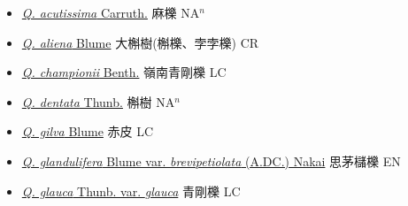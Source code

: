 \begin{itemize}
  \begin{itemize}
        \item[] \href{http://www.theplantlist.org/tpl1.1/search?q=Quercus+acutissima}{\textit{Q. acutissima} Carruth.}   麻櫟 NA$^n$
        \item[] \href{http://www.theplantlist.org/tpl1.1/search?q=Quercus+aliena}{\textit{Q. aliena} Blume}     大槲樹(槲櫟、孛孛櫟)    CR
        \item[] \href{http://www.theplantlist.org/tpl1.1/search?q=Quercus+championii}{\textit{Q. championii} Benth.}     嶺南青剛櫟 LC
        \item[] \href{http://www.theplantlist.org/tpl1.1/search?q=Quercus+dentata}{\textit{Q. dentata} Thunb.}   槲樹 NA$^n$
        \item[] \href{http://www.theplantlist.org/tpl1.1/search?q=Quercus+gilva}{\textit{Q. gilva} Blume}     赤皮 LC
        \item[] \href{http://www.theplantlist.org/tpl1.1/search?q=Quercus+glandulifera+var.+brevipetiolata}{\textit{Q. glandulifera} Blume var. \textit{brevipetiolata} (A.DC.) Nakai}   思茅櫧櫟 EN
        \item[] \href{http://www.theplantlist.org/tpl1.1/search?q=Quercus+glauca+var.+glauca}{\textit{Q. glauca} Thunb. var. \textit{glauca}}     青剛櫟 LC

\end{itemize}
\end{itemize}
